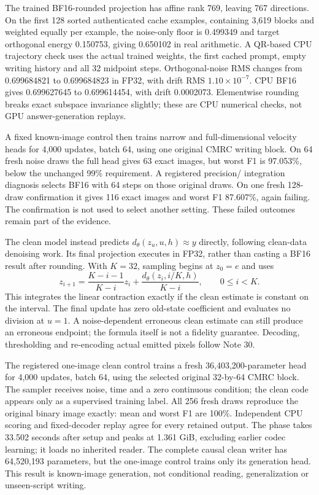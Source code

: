 \documentclass[10pt,a4paper]{article}
\begin{document}
The trained BF16-rounded projection has affine rank 769, leaving 767
directions. On the first 128 sorted authenticated cache examples, containing
3,619 blocks and weighted equally per example, the noise-only floor is
0.499349 and target orthogonal energy 0.150753, giving 0.650102 in real
arithmetic. A QR-based CPU trajectory check uses the actual trained weights,
the first cached prompt, empty writing history and all 32 midpoint steps.
Orthogonal-noise RMS changes from 0.699684821 to 0.699684823 in FP32, with
drift RMS $1.10\times10^{-7}$. CPU BF16 gives 0.699627645 to 0.699614454,
with drift 0.0002073. Elementwise rounding breaks exact subspace invariance
slightly; these are CPU numerical checks, not GPU answer-generation replays.

A fixed known-image control then trains narrow and full-dimensional velocity
heads for 4,000 updates, batch 64, using one original CMRC writing block.
On 64 fresh noise draws the full head gives 63 exact images, but worst F1
is 97.053\%, below the unchanged 99\% requirement. A registered precision/
integration diagnosis selects BF16 with 64 steps on those original draws.
On one fresh 128-draw confirmation it gives 116 exact images and worst F1
87.607\%, again failing. The confirmation is not used to select another
setting. These failed outcomes remain part of the evidence.

The clean model instead predicts $d_\theta(z_u,u,h)\approx y$ directly,
following clean-data denoising work\cite{jit}. Its final projection executes
in FP32, rather than casting a BF16 result after rounding. With $K=32$,
sampling begins at $z_0=e$ and uses
\begin{equation}
 z_{i+1}=\frac{K-i-1}{K-i}z_i+
 \frac{d_\theta(z_i,i/K,h)}{K-i},\qquad 0\leq i<K.
\end{equation}
This integrates the linear contraction exactly if the clean estimate is
constant on the interval. The final update has zero old-state coefficient
and evaluates no division at $u=1$. A noise-dependent erroneous clean
estimate can still produce an erroneous endpoint; the formula itself is
not a fidelity guarantee. Decoding, thresholding and re-encoding actual
emitted pixels follow Note 30.

The registered one-image clean control trains a fresh 36,403,200-parameter
head for 4,000 updates, batch 64, using the selected original 32-by-64 CMRC
block. The sampler receives noise, time and a zero continuous condition;
the clean code appears only as a supervised training label. All 256 fresh
draws reproduce the original binary image exactly: mean and worst F1 are
100\%. Independent CPU scoring and fixed-decoder replay agree for every
retained output. The phase takes 33.502 seconds after setup and peaks at
1.361 GiB, excluding earlier codec learning; it loads no inherited reader.
The complete causal clean writer has 64,520,193 parameters, but the one-image
control trains only its generation head. This result is known-image
generation, not conditional reading, generalization or unseen-script writing.
\end{document}
